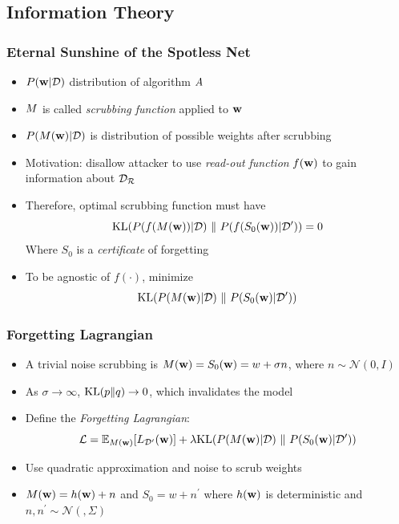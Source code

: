 \documentclass[pdf]{beamer}
\begin{document}
\subsection{Information Theory}
\begin{frame}
  \myNset[3]
  \smartart
\end{frame}

\begin{frame}
  \frametitle{
    Eternal Sunshine of the Spotless Net \cite{golatkarEternalSunshineSpotless2020}
    }
  \begin{itemize}
    \item $P(\textbf{w} | \mathcal{D})$ distribution of algorithm $A$
    \item $M$ is called \emph{scrubbing function} applied to $\textbf{w}$
    \item $P(M(\textbf{w})|\mathcal{D})$ is distribution of possible weights after scrubbing
    \item Motivation: disallow attacker to use \textit{read-out function} $f(\textbf{w})$ to gain information about $\mathcal{D_{R}}$
    \item Therefore, optimal scrubbing function must have 
    \[
      \text{KL}(P(f(M(\textbf{w}))|\mathcal{D})~\|~P(f(S_{0}(\textbf{w}))|\mathcal{D}^{\prime}))=0
    \]
    Where $S_{0}$ is a \textit{certificate} of forgetting
    \item To be agnostic of $f(\cdot)$, minimize
    \[
      \text{KL}(P(M(\textbf{w})|\mathcal{D})~\|~P(S_{0}(\textbf{w})|\mathcal{D}^{\prime})) 
    \]
  \end{itemize}
\end{frame}

\begin{frame}
  \frametitle{Forgetting Lagrangian}
  \begin{itemize}
    \item A trivial noise scrubbing is $M(\textbf{w})=S_{0}(\textbf{w}) = w+\sigma n$, where $n \sim \mathcal{N}(0,I)$
    \item As $\sigma \rightarrow \infty$, $\text{KL}(p\|q)\rightarrow 0$, which invalidates the model 
    \item Define the \emph{Forgetting Lagrangian}:
    \[
      \mathcal{L} = \mathbb{E}_{M(\textbf{w})}[L_{\mathcal{D}^{\prime}}(\textbf{w})] + \lambda\text{KL}(P(M(\textbf{w})|\mathcal{D})~\|~P(S_{0}(\textbf{w})|\mathcal{D}^{\prime})) 
    \]
    \item Use quadratic approximation and noise to scrub weights
    \item $M(\textbf{w}) = h(\textbf{w})+n$ and $S_{0}=w + n^{\prime}$ where $h(\textbf{w})$ is deterministic and $n,n^{\prime} \sim \mathcal{N}(,\Sigma)$
  \end{itemize}

\end{frame}
\end{document}

